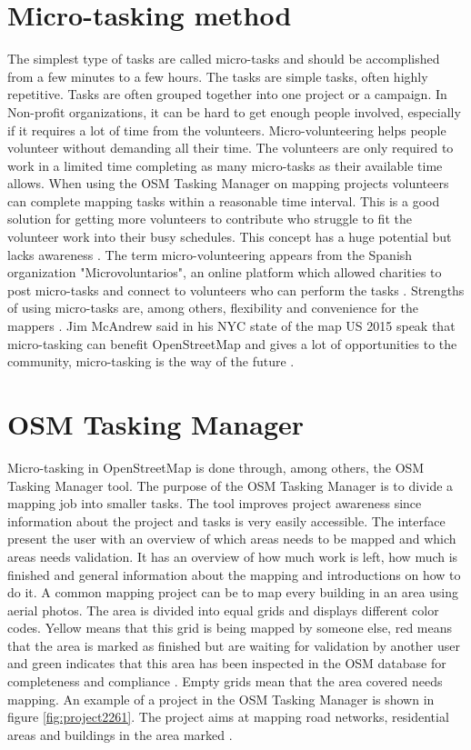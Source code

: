 \section{Micro-tasking method}
The simplest type of tasks are called micro-tasks and should be accomplished from a few minutes to a few hours. The tasks are simple tasks, often highly repetitive. Tasks are often grouped together into one project or a campaign. In Non-profit organizations, it can be hard to get enough people involved, especially if it requires a lot of time from the volunteers. Micro-volunteering helps people volunteer without demanding all their time. The volunteers are only required to work in a limited time completing as many micro-tasks as their available time allows. When using the OSM Tasking Manager on mapping projects volunteers can complete mapping tasks within a reasonable time interval. This is a good solution for getting more volunteers to contribute who struggle to fit the volunteer work into their busy schedules. This concept has a huge potential but lacks awareness \cite{Bernstein}. The term micro-volunteering appears from the Spanish organization "Microvoluntarios", an online platform which allowed charities to post micro-tasks and connect to volunteers who can perform the tasks \cite{Madalena}.  Strengths of using micro-tasks are, among others, flexibility and convenience for the mappers \cite{Madalena}. Jim McAndrew said in his NYC state of the map US 2015 speak that micro-tasking can benefit OpenStreetMap and gives a lot of opportunities to the community, micro-tasking is the way of the future \cite{McAndrew2015}.  

\section{OSM Tasking Manager}
Micro-tasking in OpenStreetMap is done through, among others, the OSM Tasking Manager tool. The purpose of the OSM Tasking Manager is to divide a mapping job into smaller tasks. The tool improves project awareness since information about the project and tasks is very easily accessible. The interface present the user with an overview of which areas needs to be mapped and which areas needs validation. It has an overview of how much work is left, how much is finished and general information about the mapping and introductions on how to do it. A common mapping project can be to map every building in an area using aerial photos. The area is divided into equal grids and displays different color codes. Yellow means that this grid is being mapped by someone else, red means that the area is marked as finished but are waiting for validation by another user and green indicates that this area has been inspected in the OSM database for completeness and compliance \cite{Palen2015}. Empty grids mean that the area covered needs mapping. An example of a project in the OSM Tasking Manager is shown in figure \ref{fig:project2261}. The project aims at mapping road networks, residential areas and buildings in the area marked \cite{HOTTaskingManager2016}.  

